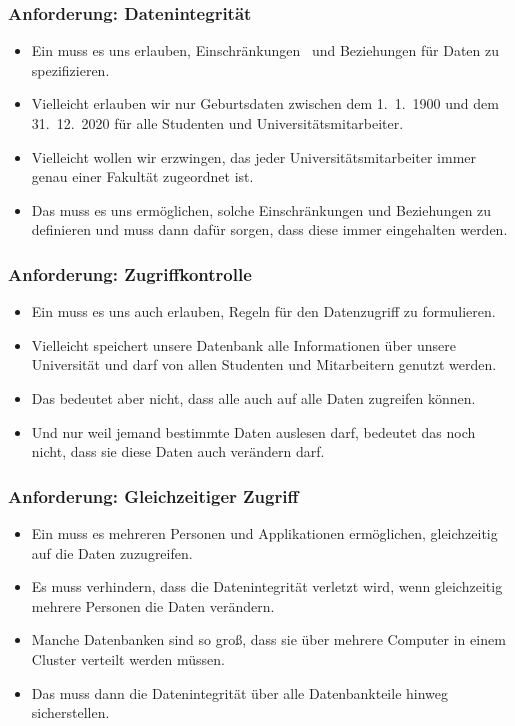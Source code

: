\documentclass[aspectratio=169,mathserif,notheorems]{beamer}%
\begin{document}
%
\begin{frame}%
\frametitle{Anforderung: Datenintegrität}%
\begin{itemize}%
\item Ein  muss es uns erlauben, Einschränkungen~ und Beziehungen für Daten zu spezifizieren.%
\item<2-> Vielleicht erlauben wir nur Geburtsdaten zwischen dem 1.~1.~1900 und dem 31.~12.~2020 für alle Studenten und Universitätsmitarbeiter.%
\item<3-> Vielleicht wollen wir erzwingen, das jeder Universitätsmitarbeiter immer genau einer Fakultät zugeordnet ist.%
\item<4-> Das  muss es uns ermöglichen, solche Einschränkungen und Beziehungen zu definieren und muss dann dafür sorgen, dass diese immer eingehalten werden.
\end{itemize}%
\end{frame}%
%
\begin{frame}%
\frametitle{Anforderung: Zugriffkontrolle}%
\begin{itemize}%
\item Ein  muss es uns auch erlauben, Regeln für den Datenzugriff zu formulieren.%
\item<2-> Vielleicht speichert unsere Datenbank alle Informationen über unsere Universität und darf von allen Studenten und Mitarbeitern genutzt werden.%
\item<3-> Das bedeutet aber nicht, dass alle auch auf alle Daten zugreifen können.%
\item<4-> Und nur weil jemand bestimmte Daten auslesen darf, bedeutet das noch nicht, dass sie diese Daten auch verändern darf.%
\end{itemize}%
\end{frame}%
%
\begin{frame}%
\frametitle{Anforderung: Gleichzeitiger Zugriff}%
\begin{itemize}%
\item Ein  muss es mehreren Personen und Applikationen ermöglichen, gleichzeitig auf die Daten zuzugreifen.%
\item<2-> Es muss verhindern, dass die Datenintegrität verletzt wird, wenn gleichzeitig mehrere Personen die Daten verändern.%
\item<3-> Manche Datenbanken sind so groß, dass sie über mehrere Computer in einem Cluster verteilt werden müssen.%
\item<4-> Das  muss dann die Datenintegrität über alle Datenbankteile hinweg sicherstellen.%
\end{itemize}%
\end{frame}%
\end{document}
